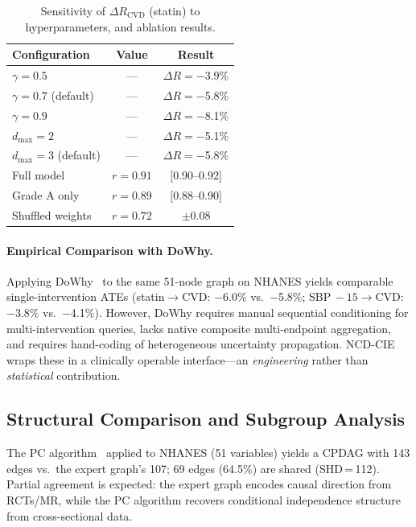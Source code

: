 \documentclass[runningheads]{llncs}
\begin{document}
\renewcommand{\arraystretch}{1.1}
\begin{table}[t]
\centering
\caption{Sensitivity of $\Delta R_{\text{CVD}}$ (statin) to
hyperparameters, and ablation results.}\label{tab:sensitivity}
\small
\begin{tabular}{@{}lcc@{}}
\toprule
\textbf{Configuration} & \textbf{Value} & \textbf{Result} \\
\midrule
$\gamma = 0.5$ & --- & $\Delta R = -$3.9\% \\
$\gamma = 0.7$ (default) & --- & $\Delta R = -$5.8\% \\
$\gamma = 0.9$ & --- & $\Delta R = -$8.1\% \\
$d_{\max} = 2$ & --- & $\Delta R = -$5.1\% \\
$d_{\max} = 3$ (default) & --- & $\Delta R = -$5.8\% \\
\midrule
Full model & $r = 0.91$ & [0.90--0.92] \\
Grade A only & $r = 0.89$ & [0.88--0.90] \\
Shuffled weights & $r = 0.72$ & $\pm 0.08$ \\
\bottomrule
\end{tabular}
\end{table}
\renewcommand{\arraystretch}{1.0}

\paragraph{Empirical Comparison with DoWhy.}
Applying DoWhy~\cite{sharma2020dowhy} to the same 51-node graph on
NHANES yields comparable single-intervention ATEs
(statin$\to$CVD: $-$6.0\% vs.\ $-$5.8\%;
SBP$\,-15\to$CVD: $-$3.8\% vs.\ $-$4.1\%).
However, DoWhy requires manual sequential conditioning for
multi-intervention queries, lacks native composite multi-endpoint
aggregation, and requires hand-coding of heterogeneous uncertainty
propagation.
NCD-CIE wraps these in a clinically operable interface---an
\emph{engineering} rather than \emph{statistical} contribution.

\subsection{Structural Comparison and Subgroup Analysis}\label{sec:pcalg}

The PC algorithm~\cite{spirtes2000causation} applied to NHANES
(51 variables) yields a CPDAG with 143 edges vs.\ the expert graph's
107; 69 edges (64.5\%) are shared (SHD\,=\,112).
Partial agreement is expected: the expert graph encodes causal
direction from RCTs/MR, while the PC algorithm recovers conditional
independence structure from cross-sectional data.
\end{document}
